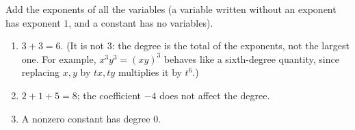 Add the exponents of all the variables (a variable written without an exponent has exponent $1$, and a constant has no variables).
\begin{enumerate}
\item[(a)] $3+3=\boxed{6}$. (It is not $3$: the degree is the total of the exponents, not the largest one. For example, $x^3y^3=(xy)^3$ behaves like a sixth-degree quantity, since replacing $x,y$ by $tx,ty$ multiplies it by $t^6$.)
\item[(b)] $2+1+5=\boxed{8}$; the coefficient $-4$ does not affect the degree.
\item[(c)] A nonzero constant has degree $\boxed{0}$.
\end{enumerate}
